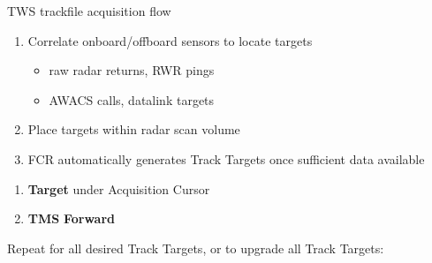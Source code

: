 \begin{checklistenumerate}
{
        \caption{TWS trackfile acquisition flow}
    }
    \begin{enumerate}
        \item Correlate onboard/offboard sensors to locate targets
        \begin{itemize}
            \item raw radar returns, RWR pings
            \item AWACS calls, datalink targets
        \end{itemize}
        \item Place targets within radar scan volume
        \item FCR automatically generates Track Targets once sufficient data available
    \end{enumerate}
    \label{subsec:sensorsaa:apg68:tws:multi:sys}
    \begin{enumerate}
        \item \textbf{Target} \dotfill under Acquisition Cursor
        \item \textbf{TMS} \dotfill \textbf{Forward} 
    \end{enumerate}
    Repeat for all desired Track Targets,
    or to upgrade all Track Targets:
    \begin{enumerate}

\end{enumerate}
\end{checklistenumerate}
